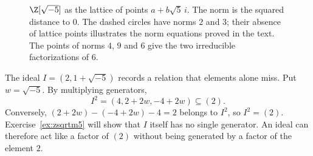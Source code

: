 \begin{figure}[ht]
\centering
{}
\caption{$\Z[\sqrt{-5}]$ as the lattice of points $a+b\sqrt5\,i$. The norm is the squared distance to $0$. The dashed circles have norms $2$ and $3$; their absence of lattice points illustrates the norm equations proved in the text. The points of norms $4$, $9$ and $6$ give the two irreducible factorizations of $6$.}
\label{fig:lattice}
\end{figure}

The ideal $I=(2,1+\sqrt{-5})$ records a relation that elements alone
miss. Put $w=\sqrt{-5}$. By multiplying generators,
\[
I^2=(4,2+2w,-4+2w)\subseteq(2).
\]
Conversely, $(2+2w)-(-4+2w)-4=2$ belongs to $I^2$, so
$I^2=(2)$. Exercise~\ref{ex:zsqrtm5} will show that $I$ itself has
no single generator. An ideal can therefore act like a factor of $(2)$
without being generated by a factor of the element $2$.

